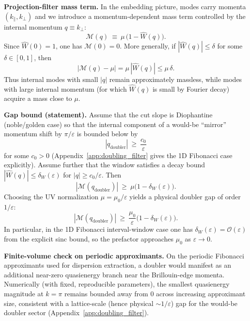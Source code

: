 \noindent\textbf{Projection-filter mass term.}
In the embedding picture, modes carry momenta $(k_{\parallel},k_\perp)$ and we introduce a momentum-dependent mass term controlled by the internal momentum $q\equiv k_\perp$:
\begin{equation}
    \mathcal{M}(q)\ \equiv\ \mu\,\bigl(1-\widehat{W}(q)\bigr).
\label{eq:proj_filter_mass}
\end{equation}
Since $\widehat{W}(0)=1$, one has $\mathcal{M}(0)=0$. More generally, if $|\widehat{W}(q)|\le \delta$ for some $\delta\in[0,1]$, then
\begin{equation}
    |\mathcal{M}(q)-\mu|=\mu\,|\widehat{W}(q)|\le \mu\,\delta.
\end{equation}
Thus internal modes with small $|q|$ remain approximately massless, while modes with large internal momentum (for which $\widehat{W}(q)$ is small by Fourier decay) acquire a mass close to $\mu$.\par

\noindent\textbf{Gap bound (statement).}
Assume that the cut slope is Diophantine (noble/golden case) so that the internal component of a would-be ``mirror'' momentum shift by $\pi/\varepsilon$ is bounded below by
\begin{equation}
    |q_{\mathrm{doubler}}|\ \ge\ \frac{c_0}{\varepsilon}
\end{equation}
for some $c_0>0$ (Appendix~\ref{app:doubling_filter} gives the 1D Fibonacci case explicitly).
Assume further that the window satisfies a decay bound $|\widehat{W}(q)|\le \delta_W(\varepsilon)$ for $|q|\ge c_0/\varepsilon$. Then
\begin{equation}
    |\mathcal{M}(q_{\mathrm{doubler}})| \ \ge\ \mu\bigl(1-\delta_W(\varepsilon)\bigr).
\end{equation}
Choosing the UV normalization $\mu=\mu_0/\varepsilon$ yields a physical doubler gap of order $1/\varepsilon$:
\begin{equation}
    |\mathcal{M}(q_{\mathrm{doubler}})| \ \ge\ \frac{\mu_0}{\varepsilon}\bigl(1-\delta_W(\varepsilon)\bigr).
\end{equation}
In particular, in the 1D Fibonacci interval-window case one has $\delta_W(\varepsilon)=\mathcal{O}(\varepsilon)$ from the explicit sinc bound, so the prefactor approaches $\mu_0$ as $\varepsilon\to 0$.\par

\noindent\textbf{Finite-volume check on periodic approximants.}
On the periodic Fibonacci approximants used for dispersion extraction, a doubler would manifest as an additional near-zero quasienergy branch near the Brillouin-edge momenta. Numerically (with fixed, reproducible parameters), the smallest quasienergy magnitude at $k=\pi$ remains bounded away from $0$ across increasing approximant size, consistent with a lattice-scale (hence physical $\sim 1/\varepsilon$) gap for the would-be doubler sector (Appendix~\ref{app:doubling_filter}).
